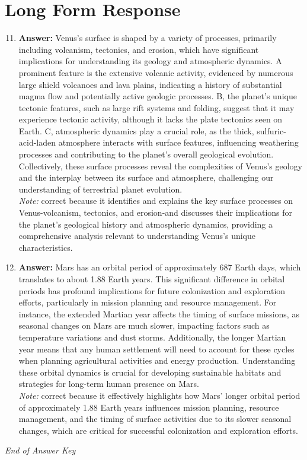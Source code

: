 \documentclass[12pt]{article}
\begin{document}
\section*{Long Form Response}
\begin{enumerate}[label=\arabic*.]
\setcounter{enumi}{10}
\item \textbf{Answer:} Venus's surface is shaped by a variety of processes, primarily including volcanism, tectonics, and erosion, which have significant implications for understanding its geology and atmospheric dynamics. A prominent feature is the extensive volcanic activity, evidenced by numerous large shield volcanoes and lava plains, indicating a history of substantial magma flow and potentially active geologic processes. B, the planet's unique tectonic features, such as large rift systems and folding, suggest that it may experience tectonic activity, although it lacks the plate tectonics seen on Earth. C, atmospheric dynamics play a crucial role, as the thick, sulfuric-acid-laden atmosphere interacts with surface features, influencing weathering processes and contributing to the planet's overall geological evolution. Collectively, these surface processes reveal the complexities of Venus's geology and the interplay between its surface and atmosphere, challenging our understanding of terrestrial planet evolution.
\\ \textit{Note:} correct because it identifies and explains the key surface processes on Venus-volcanism, tectonics, and erosion-and discusses their implications for the planet's geological history and atmospheric dynamics, providing a comprehensive analysis relevant to understanding Venus's unique characteristics.
\item \textbf{Answer:} Mars has an orbital period of approximately 687 Earth days, which translates to about 1.88 Earth years. This significant difference in orbital periods has profound implications for future colonization and exploration efforts, particularly in mission planning and resource management. For instance, the extended Martian year affects the timing of surface missions, as seasonal changes on Mars are much slower, impacting factors such as temperature variations and dust storms. Additionally, the longer Martian year means that any human settlement will need to account for these cycles when planning agricultural activities and energy production. Understanding these orbital dynamics is crucial for developing sustainable habitats and strategies for long-term human presence on Mars.
\\ \textit{Note:} correct because it effectively highlights how Mars' longer orbital period of approximately 1.88 Earth years influences mission planning, resource management, and the timing of surface activities due to its slower seasonal changes, which are critical for successful colonization and exploration efforts.
\end{enumerate}

\vfill
\noindent\textit{End of Answer Key}
\end{document}
